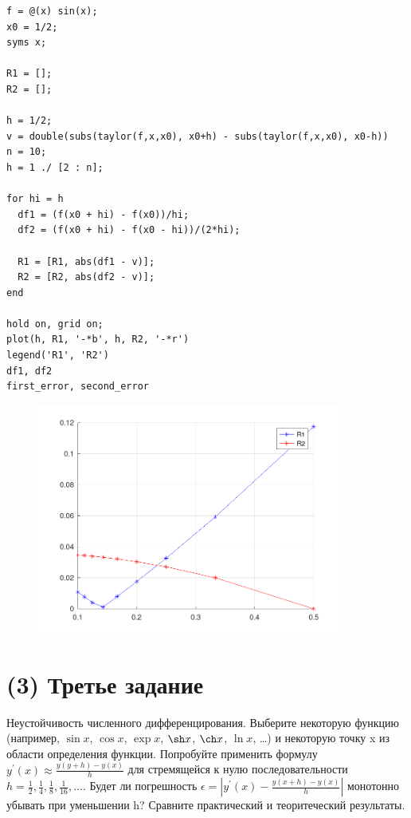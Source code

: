 \begin{lstlisting}
f = @(x) sin(x);
x0 = 1/2;
syms x;

R1 = [];
R2 = [];

h = 1/2;
v = double(subs(taylor(f,x,x0), x0+h) - subs(taylor(f,x,x0), x0-h))
n = 10;
h = 1 ./ [2 : n];

for hi = h
  df1 = (f(x0 + hi) - f(x0))/hi;
  df2 = (f(x0 + hi) - f(x0 - hi))/(2*hi);

  R1 = [R1, abs(df1 - v)];
  R2 = [R2, abs(df2 - v)];
end

hold on, grid on;
plot(h, R1, '-*b', h, R2, '-*r')
legend('R1', 'R2')
df1, df2
first_error, second_error
\end{lstlisting}
\begin{figure}[H]
  \caption{}
  \label{fig:plot_2}
  \centering
  \includegraphics[width=0.9\textwidth]{images/image_2.png}
\end{figure}

\section{(3) Третье задание}
Неустойчивость численного дифференцирования. Выберите некоторую функцию (например, $\sin x$, $\cos x$, $\exp x$, $\sh x$, $\ch x$, $\ln x$, \ldots) и некоторую точку x из области определения функции. Попробуйте применить формулу $y^{'}(x) \approx \frac{y(y+h) - y(x)}{h}$ для стремящейся к нулю последовательности $h = \frac{1}{2}, \frac{1}{4}, \frac{1}{8}, \frac{1}{16}, \ldots$. Будет ли погрешность $\epsilon = \left |y^{'}(x) - \frac{y(x+h) - y(x)}{h} \right |$ монотонно убывать при уменьшении h? Сравните практический и теоритеческий результаты.\\[5mm]

